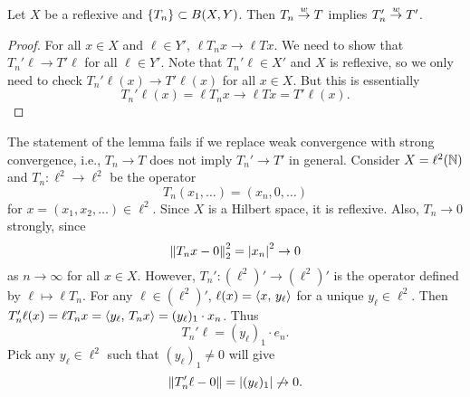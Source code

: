 \begin{lemma}
    Let $X$ be a reflexive and $\left\{ {T_n} \right\}\subset B(X,Y)$. Then 
    $T_n\overset{w}{\to} T$ implies $T_n'\overset{w}{\to} T'$.
\end{lemma}
\begin{proof}
    For all $x\in X$ and $\ell\in Y'$, $\ell T_nx\to\ell Tx$. We need 
    to show that $T_n'\ell\to T'\ell$ for all $\ell\in Y'$. Note that 
    $T_n'\ell\in X'$ and $X$ is reflexive, so we only need to check 
    $T_n'\ell(x)\to T'\ell(x)$ for all $x\in X$. But this is essentially 
    \begin{equation*}
        T_n'\ell(x) = \ell T_nx\to \ell Tx = T'\ell(x).
    \end{equation*}
\end{proof}
\begin{remark}
    The statement of the lemma fails if we replace weak convergence with 
    strong convergence, i.e., $T_n\to T$ does not imply $T_n'\to T'$ in general. 
    Consider $X = \ell^2(\mathbb{N})$ and $T_n:\ell^2\to\ell^2$ be the operator 
    \begin{equation*}
        T_n(x_1,\ldots) = (x_n,0,\ldots)
    \end{equation*}
    for $x = (x_1,x_2,\ldots)\in\ell^2$. Since $X$ is a Hilbert space, 
    it is reflexive. Also, $T_n\to 0$ strongly, since 
    \begin{equation*}
        \left\lVert {T_nx - 0} \right\rVert_2^2 = \left\lvert {x_n} \right\rvert^2\to 0 
    \end{equation*}
    as $n\to\infty$ for all $x\in X$. However, $T_n':(\ell^2)'\to(\ell^2)'$ 
    is the operator defined by $\ell\mapsto \ell T_n$. For any 
    $\ell\in(\ell^2)'$, $\ell(x) = \left\langle {x},\, {y_\ell} \right\rangle$ for a unique $y_\ell\in\ell^2$. 
    Then $T_n'\ell(x) = \ell T_nx = \left\langle {y_\ell},\, {T_nx} \right\rangle = (y_\ell)_1\cdot x_n$. 
    Thus 
    \begin{equation*}
        T_n'\ell = (y_\ell)_1\cdot e_n.
    \end{equation*}
    Pick any $y_\ell\in\ell^2$ such that $(y_\ell)_1\neq 0$ will give 
    \begin{equation*}
        \left\lVert {T_n'\ell - 0} \right\rVert = \left\lvert {(y_\ell)_1} \right\rvert \not\to 0.
    \end{equation*}
\end{remark}

